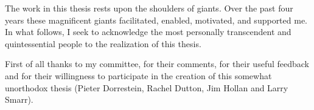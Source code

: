 \begin{frontmatter}
\printglossary[title=List of Abbreviations,toctitle=List of Abbreviations,nonumberlist ]
\listoffigures  %
\listoftables   %

%
%
\begin{acknowledgements}

    The work in this thesis rests upon the shoulders of giants. Over the past 
    four years these magnificent giants facilitated, enabled, motivated, and 
    supported me.  In what follows, I seek to acknowledge the most personally 
    transcendent and quintessential people to the realization of this thesis.

    First of all thanks to my committee, for their comments, for their useful
    feedback and for their willingness to participate in the creation of this
    somewhat unorthodox thesis (Pieter Dorrestein, Rachel Dutton, Jim Hollan 
    and Larry Smarr).


\end{acknowledgements}
\end{frontmatter}
